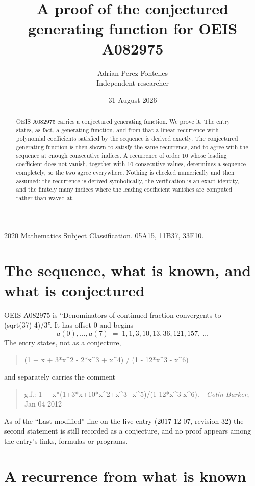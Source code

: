 \documentclass[11pt,a4paper]{article}
\title{A proof of the conjectured generating function for OEIS A082975}
\author{Adrian Perez Fontelles\\ \small Independent researcher}
\date{31 August 2026}
\theoremstyle{plain}
\theoremstyle{definition}
\begin{document}
\maketitle

\begin{abstract}
OEIS A082975 carries a conjectured generating function. We prove it. The entry states, as fact,
a generating function, and from that a linear recurrence with polynomial coefficients satisfied by
the sequence is derived exactly. The conjectured generating function is then shown to satisfy the
same recurrence, and to agree with the sequence at enough consecutive indices. A recurrence
of order $10$ whose leading coefficient does not vanish, together with $10$
consecutive values, determines a sequence completely, so the two agree everywhere. Nothing
is checked numerically and then assumed: the recurrence is derived symbolically, the
verification is an exact identity, and the finitely many indices where the leading
coefficient vanishes are computed rather than waved at.
\end{abstract}

\noindent\small 2020 Mathematics Subject Classification. 05A15, 11B37, 33F10.\normalsize

\section{The sequence, what is known, and what is conjectured}

OEIS A082975 is ``Denominators of continued fraction convergents to (sqrt(37)-4)/3''. It has offset $0$ and begins
\[
a(0),\dots,a(7)\;=\;1, 1, 3, 10, 13, 36, 121, 157,\ \dots
\]
The entry states, not as a conjecture,
\begin{quote}\small
(1 + x + 3*x\textasciicircum{}2 - 2*x\textasciicircum{}3 + x\textasciicircum{}4) / (1 - 12*x\textasciicircum{}3 - x\textasciicircum{}6)
\end{quote}
and separately carries the comment
\begin{quote}\small
g.f.: 1 + x*(1+3*x+10*x\textasciicircum{}2+x\textasciicircum{}3+x\textasciicircum{}5)/(1-12*x\textasciicircum{}3-x\textasciicircum{}6). - \emph{Colin Barker}, Jan 04 2012
\end{quote}
As of the ``Last modified'' line on the live entry (2017-12-07, revision 32) the second
statement is still recorded as a conjecture, and no proof appears among the entry's links,
formulas or programs.

\section{A recurrence from what is known}
\end{document}
